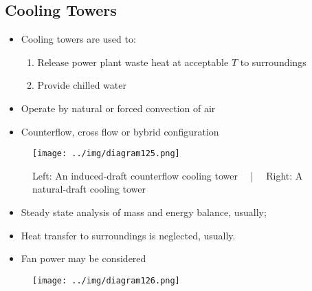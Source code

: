 \documentclass[class=report, crop=false, 12pt,a4paper]{standalone}
\numberwithin{equation}{section}
\begin{document}
\subsection{Cooling Towers}
\begin{itemize}[noitemsep]
  \item Cooling towers are used to:
  \begin{enumerate}[noitemsep]
    \item Release power plant waste heat at acceptable $T$ to surroundings
    \item Provide chilled water
  \end{enumerate}
  \item Operate by natural or forced convection of air
  \item Counterflow, cross flow or bybrid configuration
\end{itemize}
\begin{figure}[H]
  \centering
  \texttt{[image: ../img/diagram125.png]}
  \caption{Left: An induced-draft counterflow cooling tower \ \ | \ \ Right: A natural-draft cooling tower}
\end{figure}
\begin{itemize}[noitemsep]
  \item Steady state analysis of mass and energy balance, usually;
  \item Heat transfer to surroundings is neglected, usually.
  \item Fan power may be considered
\end{itemize}
\begin{figure}[H]
  \centering
  \texttt{[image: ../img/diagram126.png]}
  \caption{}
\end{figure}
\end{document}

